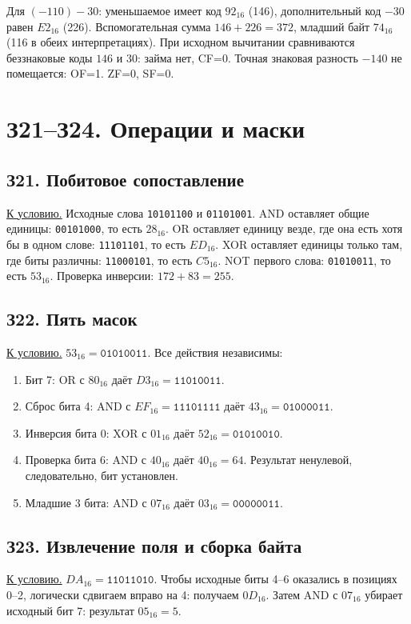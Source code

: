 Для $(-110)-30$: уменьшаемое имеет код $92_{16}$ (146), дополнительный код $-30$ равен $E2_{16}$ (226). Вспомогательная сумма $146+226=372$, младший байт $74_{16}$ (116 в обеих интерпретациях).
При исходном вычитании сравниваются беззнаковые коды $146$ и $30$: займа нет, CF=0. Точная знаковая разность $-140$ не помещается: OF=1. ZF=0, SF=0.

\section{З21--З24. Операции и маски}
\subsection*{З21. Побитовое сопоставление}\label{sol:z21}
\hyperref[task:z21]{К условию.}
Исходные слова \texttt{10101100} и \texttt{01101001}.
AND оставляет общие единицы: \texttt{00101000}, то есть $28_{16}$.
OR оставляет единицу везде, где она есть хотя бы в одном слове: \texttt{11101101}, то есть $ED_{16}$.
XOR оставляет единицы только там, где биты различны: \texttt{11000101}, то есть $C5_{16}$.
NOT первого слова: \texttt{01010011}, то есть $53_{16}$.
Проверка инверсии: $172+83=255$.

\subsection*{З22. Пять масок}\label{sol:z22}
\hyperref[task:z22]{К условию.}
$53_{16}=\texttt{01010011}$. Все действия независимы:
\begin{enumerate}
    \item Бит 7: OR с $80_{16}$ даёт $D3_{16}=\texttt{11010011}$.
    \item Сброс бита 4: AND с $EF_{16}=\texttt{11101111}$ даёт $43_{16}=\texttt{01000011}$.
    \item Инверсия бита 0: XOR с $01_{16}$ даёт $52_{16}=\texttt{01010010}$.
    \item Проверка бита 6: AND с $40_{16}$ даёт $40_{16}=64$. Результат ненулевой, следовательно, бит установлен.
    \item Младшие 3 бита: AND с $07_{16}$ даёт $03_{16}=\texttt{00000011}$.
\end{enumerate}

\subsection*{З23. Извлечение поля и сборка байта}\label{sol:z23}
\hyperref[task:z23]{К условию.}
$DA_{16}=\texttt{11011010}$. Чтобы исходные биты 4--6 оказались в позициях 0--2, логически сдвигаем вправо на 4: получаем $0D_{16}$. Затем AND с $07_{16}$ убирает исходный бит 7: результат $05_{16}=5$.

